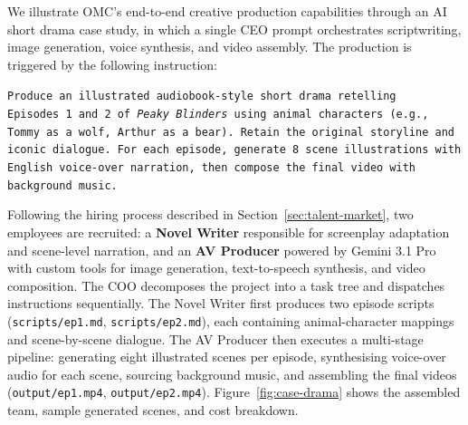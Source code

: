 \documentclass[11pt,a4paper]{article}
\begin{document}
We illustrate OMC's end-to-end creative production capabilities through an AI short drama case study, in which a single CEO prompt orchestrates scriptwriting, image generation, voice synthesis, and video assembly. The production is triggered by the following instruction:

\begin{mdframed}[
  linewidth=0.8pt,
  linecolor=black!40,
  backgroundcolor=black!2,
  innertopmargin=10pt,
  innerbottommargin=10pt,
  innerleftmargin=14pt,
  innerrightmargin=14pt,
  roundcorner=4pt
]
\sloppy
\noindent\texttt{Produce an illustrated audiobook-style short drama retelling Episodes~1 and~2 of \emph{Peaky Blinders} using animal characters (e.g., Tommy as a wolf, Arthur as a bear). Retain the original storyline and iconic dialogue. For each episode, generate 8 scene illustrations with English voice-over narration, then compose the final video with background music.}
\end{mdframed}

Following the hiring process described in Section~\ref{sec:talent-market}, two employees are recruited: a \textbf{Novel Writer} responsible for screenplay adaptation and scene-level narration, and an \textbf{AV Producer} powered by Gemini 3.1 Pro with custom tools for image generation, text-to-speech synthesis, and video composition. The COO decomposes the project into a task tree and dispatches instructions sequentially. The Novel Writer first produces two episode scripts (\texttt{scripts/ep1.md}, \texttt{scripts/ep2.md}), each containing animal-character mappings and scene-by-scene dialogue. The AV Producer then executes a multi-stage pipeline: generating eight illustrated scenes per episode, synthesising voice-over audio for each scene, sourcing background music, and assembling the final videos (\texttt{output/ep1.mp4}, \texttt{output/ep2.mp4}).  Figure~\ref{fig:case-drama} shows the assembled team, sample generated scenes, and cost breakdown.
\end{document}
